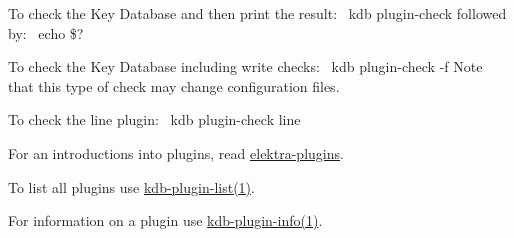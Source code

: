 To check the Key Database and then print the result\+:~\newline
 {\ttfamily kdb plugin-\/check} followed by\+:~\newline
 {\ttfamily echo \$?}

To check the Key Database including write checks\+:~\newline
 {\ttfamily kdb plugin-\/check -\/f} Note that this type of check may change configuration files.

To check the {\ttfamily line} plugin\+:~\newline
 {\ttfamily kdb plugin-\/check line}


\begin{DoxyItemize}
\item For an introductions into plugins, read \mbox{\hyperlink{src_plugins_README_md}{elektra-\/plugins}}.
\item To list all plugins use \mbox{\hyperlink{doc_help_kdb-plugin-list_md}{kdb-\/plugin-\/list(1)}}.
\item For information on a plugin use \mbox{\hyperlink{doc_help_kdb-plugin-info_md}{kdb-\/plugin-\/info(1)}}. 
\end{DoxyItemize}